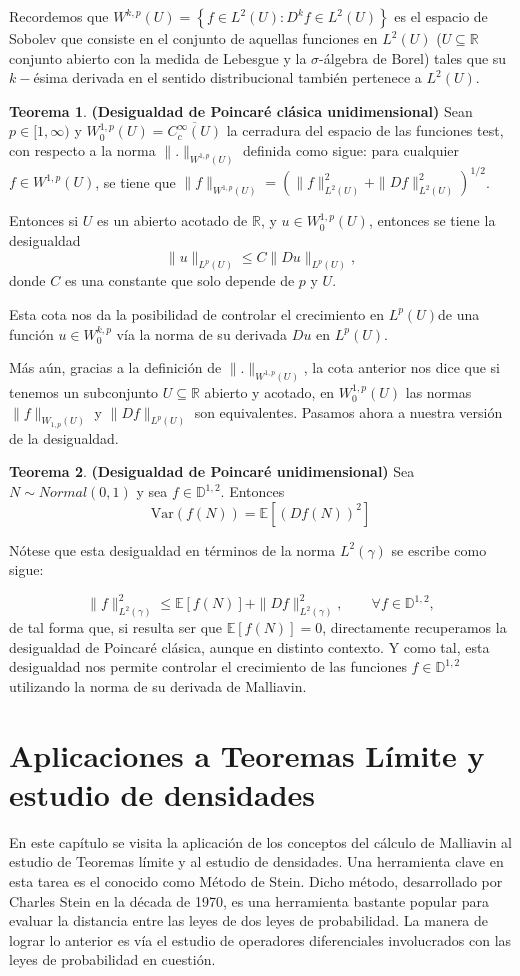 \documentclass[letterpaper,twoside,12pt]{book}
\newcommand{\R}{\mathbb{R}}
\newcommand{\D}{\mathbb{D}}
\newcommand{\E}{\mathbb{E}}
\newcommand{\1}{\mathds{1}}
\theoremstyle{definition}
\theoremstyle{definition}
\newtheorem{teo}{Teorema}
\theoremstyle{definition}
\theoremstyle{definition}
\theoremstyle{definition}
\theoremstyle{definition}
\theoremstyle{definition}
\begin{document}
 Recordemos que $W^{k,p}(U)=\left\{f\in L^{2}(U): D^kf\in L^2(U)\right\}$ es el espacio de Sobolev que consiste en el conjunto de aquellas funciones en $L^2(U)$ ($U\subseteq \R$ conjunto abierto con la medida de Lebesgue y la $\sigma$-álgebra de Borel) tales que su $k-$ésima derivada en el sentido distribucional también pertenece a $L^2(U)$.

 \begin{teo}\textbf{(Desigualdad de Poincaré clásica unidimensional)}
    Sean $p\in [1,\infty)$ y $W_0^{1,p}(U)=\overline{C^{\infty}_c(U)}$ la cerradura del espacio de las funciones test, con respecto a la norma $\|.\|_{W^{1,p}(U)}$ definida como sigue: para cualquier $f\in W^{1,p}(U)$, se tiene que $\|f\|_{W^{1,p}(U)}=\left(\|f\|_{L^{2}(U)}^2+\|Df\|_{L^2(U)}^2\right)^{1/2}$.

    Entonces si $U$ es un abierto acotado de $\R$, y $u\in W_0^{1,p}(U)$, entonces se tiene la desigualdad 
    \[
    \|u\|_{L^{p}(U)}\leq C\|Du\|_{L^p(U)},   
    \]
    donde $C$ es una constante que solo depende de $p$ y $U$. 
    \end{teo}
    Esta cota nos da la posibilidad de controlar el crecimiento en $L^p(U)$de una función $u\in W_0^{k,p}$ vía la norma de su derivada $Du$ en $L^p(U)$.

    Más aún, gracias a la definición de $\|.\|_{W^{1,p}(U)}$, la cota anterior nos dice que si tenemos un subconjunto $U\subseteq \R$ abierto y acotado, en $W_0^{1,p}(U)$ las normas $\|f\|_{W_{1,p}(U)}$ y $\|Df\|_{L^p(U)}$ son equivalentes. Pasamos ahora a nuestra versión de la desigualdad.
    \begin{teo} \textbf{(Desigualdad de Poincaré unidimensional)} Sea $N\sim Normal(0,1)$ y sea $f\in \D^{1,2}$. Entonces
        \[
        \text{Var}\left(f(N)\right)=\E\left[(Df(N))^2\right]    
        \]     
     \end{teo}
Nótese que esta desigualdad en términos de la norma $L^2(\gamma)$ se escribe como sigue:

\[
\|f\|^2_{L^2(\gamma)}\leq \E\left[f(N)\right]+\|Df\|^2_{L^2(\gamma)}, \qquad \forall f\in \D^{1,2},
\]
de tal forma que, si resulta ser que $\E\left[f(N)\right]=0$, directamente recuperamos la desigualdad de Poincaré clásica, aunque en distinto contexto. Y como tal, esta desigualdad nos permite controlar el crecimiento de las funciones $f\in \D^{1,2}$ utilizando la norma de su derivada de Malliavin.

\chapter{Aplicaciones a Teoremas Límite y estudio de densidades}
En este capítulo se visita la aplicación de los conceptos del cálculo de Malliavin al estudio de Teoremas límite y al estudio de densidades. 
Una herramienta clave en esta tarea es el conocido como Método de Stein. 
Dicho método, desarrollado por Charles Stein en la década de 1970, es una herramienta bastante popular para evaluar la distancia entre las leyes de dos leyes de probabilidad. La manera de lograr lo anterior es vía el estudio de operadores diferenciales involucrados con las leyes de probabilidad en cuestión.
\end{document}

